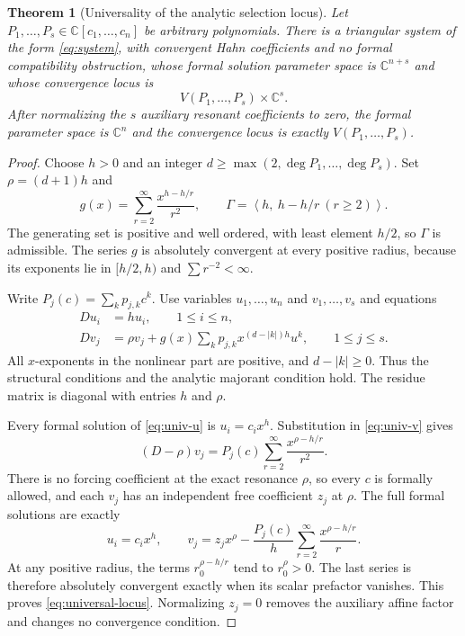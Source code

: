 \documentclass[11pt,a4paper]{article}
\numberwithin{equation}{section}
\newtheorem{theorem}{Theorem}[section]
\theoremstyle{definition}
\theoremstyle{remark}
\newcommand{\C}{\mathbb C}
\newcommand{\G}{\Gamma}
\begin{document}
\begin{theorem}[Universality of the analytic selection locus]
\label{thm:universality}
Let $P_1,\ldots,P_s\in\C[c_1,\ldots,c_n]$ be arbitrary polynomials.
There is a triangular system of the form \eqref{eq:system}, with convergent
Hahn coefficients and no formal compatibility obstruction, whose formal
solution parameter space is $\C^{n+s}$ and whose convergence locus is
\begin{equation}\label{eq:universal-locus}
 V(P_1,\ldots,P_s)\times\C^s.
\end{equation}
After normalizing the $s$ auxiliary resonant coefficients to zero, the
formal parameter space is $\C^n$ and the convergence locus is exactly
$V(P_1,\ldots,P_s)$.
\end{theorem}
\begin{proof}
Choose $h>0$ and an integer $d\geq\max(2,\deg P_1,\ldots,\deg P_s)$.
Set $\rho=(d+1)h$ and
\begin{equation}\label{eq:g-universal}
 g(x)=\sum_{r=2}^{\infty}\frac{x^{h-h/r}}{r^2},\qquad
 \G=\left\langle h,\ h-h/r\ (r\geq2)\right\rangle.
\end{equation}
The generating set is positive and well ordered, with least element $h/2$,
so $\G$ is admissible. The series $g$ is absolutely convergent at every
positive radius, because its exponents lie in $[h/2,h)$ and
$\sum r^{-2}<\infty$.

Write $P_j(c)=\sum_k p_{j,k}c^k$. Use variables $u_1,\ldots,u_n$ and
$v_1,\ldots,v_s$ and equations
\begin{align}
 Du_i&=h u_i,\qquad 1\leq i\leq n,\label{eq:univ-u}\\
 Dv_j&=\rho v_j+g(x)\sum_k p_{j,k}
               x^{(d-|k|)h}u^k,
           \qquad 1\leq j\leq s.\label{eq:univ-v}
\end{align}
All $x$-exponents in the nonlinear part are positive, and $d-|k|\geq0$.
Thus the structural conditions and the analytic majorant condition hold.
The residue matrix is diagonal with entries $h$ and $\rho$.

Every formal solution of \eqref{eq:univ-u} is $u_i=c_i x^h$.
Substitution in \eqref{eq:univ-v} gives
\[
 (D-\rho)v_j=P_j(c)\sum_{r=2}^{\infty}\frac{x^{\rho-h/r}}{r^2}.
\]
There is no forcing coefficient at the exact resonance $\rho$, so every
$c$ is formally allowed, and each $v_j$ has an independent free coefficient
$z_j$ at $\rho$. The full formal solutions are exactly
\begin{equation}\label{eq:univ-solution}
 u_i=c_i x^h,\qquad
 v_j=z_jx^\rho-\frac{P_j(c)}h
                  \sum_{r=2}^{\infty}\frac{x^{\rho-h/r}}r.
\end{equation}
At any positive radius, the terms $r_0^{\rho-h/r}$ tend to
$r_0^\rho>0$. The last series is therefore absolutely convergent exactly
when its scalar prefactor vanishes. This proves
\eqref{eq:universal-locus}. Normalizing $z_j=0$ removes the auxiliary
affine factor and changes no convergence condition.
\end{proof}
\end{document}
